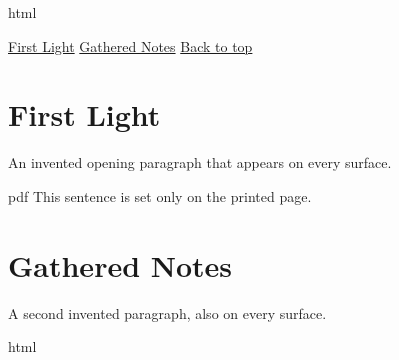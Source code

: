 \documentclass{article}
\begin{document}
\begin{ifbackend}{html}
\begin{nav}
\href{#first-light}{First Light} \href{#gathered-notes}{Gathered Notes} \href{#top}{Back to top}
\end{nav}
\end{ifbackend}

\section*{First Light}

An invented opening paragraph that appears on every surface.

\begin{ifbackend}{pdf}
This sentence is set only on the printed page.
\end{ifbackend}

\section*{Gathered Notes}

A second invented paragraph, also on every surface.

\begin{ifbackend}{html}
\begin{nav}[label = Return to top, pin = bottom right, offset = 1.5em, reveal = 300px]
\href{#top}{}
\end{nav}
\end{ifbackend}
\end{document}
